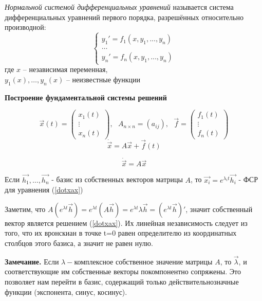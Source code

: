 \Def \textit{Нормальной системой дифференциальных уравнений} называется система дифференциальных уравнений первого порядка, разрешённых относительно производной:
\begin{equation*}
 \begin{cases}
   y_1' = f_1(x, y_1, ..., y_n) \\
   \dots \\
   y_n' = f_n(x, y_1, ..., y_n)
 \end{cases}
\end{equation*}
где $x$ -- независимая переменная,\\
$y_1(x), \dots, y_n(x)$ -- неизвестные функции


\textbf{Построение фундаментальной системы решений}

$$
\Vec{x}(t) = \begin{pmatrix}
x_{1}(t)\\
\vdots\\
x_{n}(t)
\end{pmatrix},\ \ \ 
A_{n\times n} = (a_{ij}),\ \ \ 
\Vec{f} = \begin{pmatrix}
f_{1}(t)\\
\vdots\\
f_{n}(t)
\end{pmatrix} 
$$
\begin{equation}
\dot{\Vec{x}} = A\Vec{x} + \Vec{f}(t)
\end{equation}

\begin{equation}\label{dotxax}
\dot{\Vec{x}} = A\Vec{x}
\end{equation}

\Th Если $\Vec{h_1}, \dots,\Vec{h_n}$ - базис из собственных векторов матрицы $A$, то $\Vec{x_i} = e^{\lambda_it}\Vec{h_i}$ - ФСР для уравнения (\ref{dotxax})

\Proof
Заметим, что $A(e^{\lambda t}\Vec{h}) = e^{\lambda t} (A\vec{h}) = e^{\lambda t}\lambda \Vec{h} = (e^{\lambda t} \Vec{h})'$, значит собственный вектор является решением (\ref{dotxax}). Их линейная независимость следует из того, что их вронскиан в точке t=0 равен определителю из координатных столбцов этого базиса, а значит не равен нулю.
\EndProof

\textbf{Замечание.} Если $\lambda - $комплексное собственное значение матрицы $A$, то $\Vec{\lambda}$, и соответствующие им собственные векторы покомпонентно сопряжены. Это позволяет нам перейти в базис, содержащий только действительнозначные функции (экспонента, синус, косинус).

